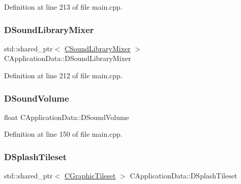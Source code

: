 Definition at line 213 of file main.\+cpp.

\hypertarget{classCApplicationData_aa1e6876121bb4fb229ec6b930a8a6766}{}\label{classCApplicationData_aa1e6876121bb4fb229ec6b930a8a6766} 
\subsubsection{\texorpdfstring{D\+Sound\+Library\+Mixer}{DSoundLibraryMixer}}
{\footnotesize\ttfamily std\+::shared\+\_\+ptr$<$ \hyperlink{classCSoundLibraryMixer}{C\+Sound\+Library\+Mixer} $>$ C\+Application\+Data\+::\+D\+Sound\+Library\+Mixer\hspace{0.3cm}{\ttfamily [protected]}}



Definition at line 212 of file main.\+cpp.

\hypertarget{classCApplicationData_aa6e540f860dcb1929ef36ddce3be3691}{}\label{classCApplicationData_aa6e540f860dcb1929ef36ddce3be3691} 
\subsubsection{\texorpdfstring{D\+Sound\+Volume}{DSoundVolume}}
{\footnotesize\ttfamily float C\+Application\+Data\+::\+D\+Sound\+Volume\hspace{0.3cm}{\ttfamily [protected]}}



Definition at line 150 of file main.\+cpp.

\hypertarget{classCApplicationData_aea23915b726e1a5aa68a309109679ae1}{}\label{classCApplicationData_aea23915b726e1a5aa68a309109679ae1} 
\subsubsection{\texorpdfstring{D\+Splash\+Tileset}{DSplashTileset}}
{\footnotesize\ttfamily std\+::shared\+\_\+ptr$<$ \hyperlink{classCGraphicTileset}{C\+Graphic\+Tileset} $>$ C\+Application\+Data\+::\+D\+Splash\+Tileset\hspace{0.3cm}{\ttfamily [protected]}}



